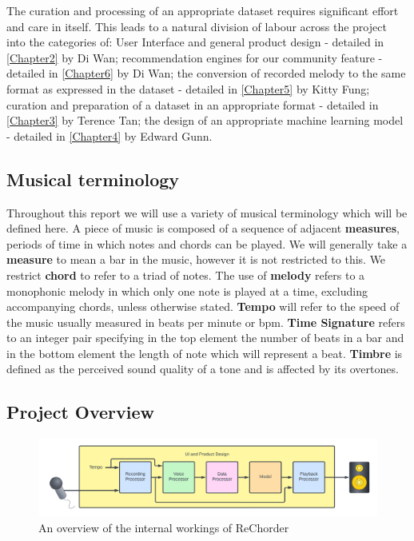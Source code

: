 The curation and processing of an appropriate dataset requires significant effort and care in itself.
This leads to a natural division of labour across the project into the categories of:
\label{sec:Introduction}
User Interface and general product design - detailed in \cref{Chapter2} by Di Wan;
recommendation engines for our community feature - detailed in \cref{Chapter6} by Di Wan;
the conversion of recorded melody to the same format as expressed in the dataset - detailed in \cref{Chapter5} by Kitty Fung;
curation and preparation of a dataset in an appropriate format - detailed in \cref{Chapter3} by Terence Tan;
the design of an appropriate machine learning model - detailed in \cref{Chapter4} by Edward Gunn.



\subsection{Musical terminology}
Throughout this report we will use a variety of musical terminology which will be defined here. A piece of music is composed of a sequence of adjacent \textbf{measures}, periods of time in which notes and chords can be played. 
We will generally take a \textbf{measure} to mean a bar in the music, however it is not restricted to this. We restrict \textbf{chord} to refer to a triad of notes.%
  The use of \textbf{melody} refers to a monophonic melody in which only one note is played at a time, excluding accompanying chords, unless otherwise stated.
\textbf{Tempo} will refer to the speed of the music usually measured in beats per minute or bpm.
\textbf{Time Signature} refers to an integer pair specifying in the top element the number of beats in a bar and in the bottom element the length of note which will represent a beat.
\textbf{Timbre} is defined as the perceived sound quality of a tone and is affected by its overtones.

\subsection{Project Overview}
\label{Project Overview}
\begin{figure}
    \centering
    \includegraphics[width=0.8\columnwidth]{Figures/Project Overview}
    \decoRule
    \caption[]{An overview of the internal workings of ReChorder}
    \label{fig:MVPOverview}
\end{figure}

